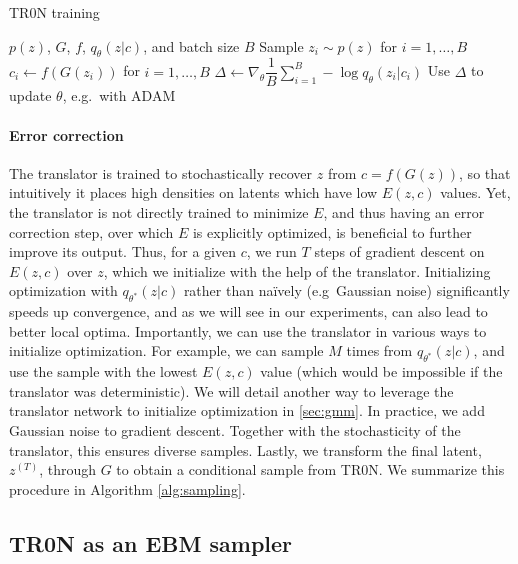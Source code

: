 \documentclass[nohyperref]{article}
\theoremstyle{plain}
\theoremstyle{definition}
\theoremstyle{remark}
\begin{document}
\begin{algorithm}[t]
   \caption{TR0N training}
   \label{alg:training}
\begin{algorithmic}
    $p(z)$, $G$, $f$, $q_\theta(z|c)$, and batch size $B$
   \STATE Sample $z_i \sim p(z)$ for $i=1,\dots,B$
   \STATE $c_i \leftarrow f(G(z_i))$ for $i=1,\dots,B$
   \STATE $\Delta \leftarrow \nabla_\theta \dfrac{1}{B}\displaystyle \sum_{i=1}^B -\log q_\theta(z_i|c_i)$
   \STATE Use $\Delta$ to update $\theta$, e.g.\ with ADAM \citep{kingma2015adam}
   \ENDWHILE
\end{algorithmic}
\end{algorithm}

\paragraph{Error correction} The translator is trained to stochastically recover $z$ from $c=f(G(z))$, so that intuitively it places high densities on latents which have low $E(z, c)$ values. Yet, the translator is not directly trained to minimize $E$, and thus having an error correction step, over which $E$ is explicitly optimized, is beneficial to further improve its output. Thus, for a given $c$, we run $T$ steps of gradient descent on $E(z, c)$ over $z$, which we initialize with the help of the translator. Initializing optimization with $q_{\theta^*}(z|c)$ rather than na\"ively (e.g\ Gaussian noise) significantly speeds up convergence, and as we will see in our experiments, can also lead to better local optima. Importantly, we can use the translator in various ways to initialize optimization. For example, we can sample $M$ times from $q_{\theta^*}(z|c)$, and use the sample with the lowest $E(z, c)$ value (which would be impossible if the translator was deterministic). We will detail another way to leverage the translator network to initialize optimization in \autoref{sec:gmm}. In practice, we add Gaussian noise to gradient descent. Together with the stochasticity of the translator, this ensures diverse samples. Lastly, we transform the final latent, $z^{(T)}$, through $G$ to obtain a conditional sample from TR0N. We summarize this procedure in Algorithm \ref{alg:sampling}.


\subsection{TR0N as an EBM sampler}
\end{document}
